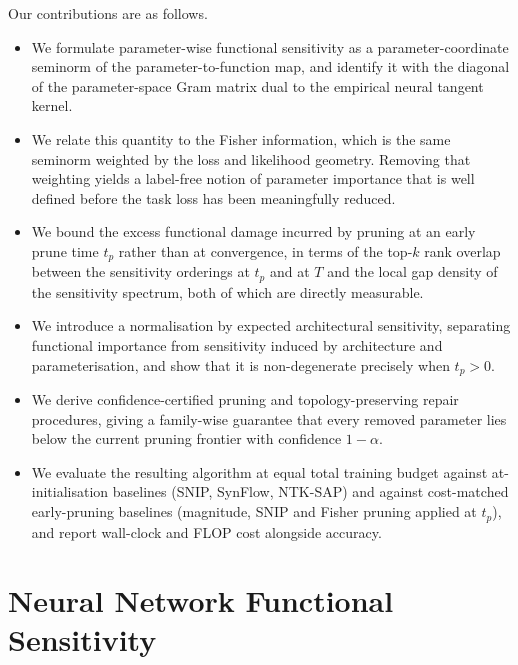 \documentclass{article}
\theoremstyle{definition}
\theoremstyle{remark}
\begin{document}
Our contributions are as follows.
\begin{itemize}
    \item We formulate parameter-wise functional sensitivity as a
    parameter-coordinate seminorm of the parameter-to-function map, and identify
    it with the diagonal of the parameter-space Gram matrix dual to the
    empirical neural tangent kernel.
    \item We relate this quantity to the Fisher information, which is the same
    seminorm weighted by the loss and likelihood geometry. Removing that
    weighting yields a label-free notion of parameter importance that is
    well defined before the task loss has been meaningfully reduced.
    \item We bound the excess functional damage incurred by pruning at an
    early prune time $t_p$ rather than at convergence, in terms of the top-$k$
    rank overlap between the sensitivity orderings at $t_p$ and at $T$ and the
    local gap density of the sensitivity spectrum, both of which are directly
    measurable.
    \item We introduce a normalisation by expected architectural sensitivity,
    separating functional importance from sensitivity induced by architecture
    and parameterisation, and show that it is non-degenerate precisely when
    $t_p>0$.
    \item We derive confidence-certified pruning and topology-preserving repair
    procedures, giving a family-wise guarantee that every removed parameter
    lies below the current pruning frontier with confidence $1-\alpha$.
    \item We evaluate the resulting algorithm at equal total training budget
    against at-initialisation baselines (SNIP, SynFlow, NTK-SAP) and against
    cost-matched early-pruning baselines (magnitude, SNIP and Fisher pruning
    applied at $t_p$), and report wall-clock and FLOP cost alongside accuracy.
\end{itemize}

\section{Neural Network Functional Sensitivity}
\label{sec:sensitivity}

\end{document}
